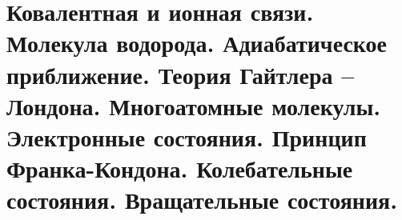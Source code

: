 \chapter{Ковалентная и ионная связи. Молекула водорода. Адиабатическое 
приближение. Теория Гайтлера -- Лондона. Многоатомные молекулы. 
Электронные состояния. Принцип Франка-Кондона. Колебательные состояния. 
Вращательные состояния.}

\newpage
